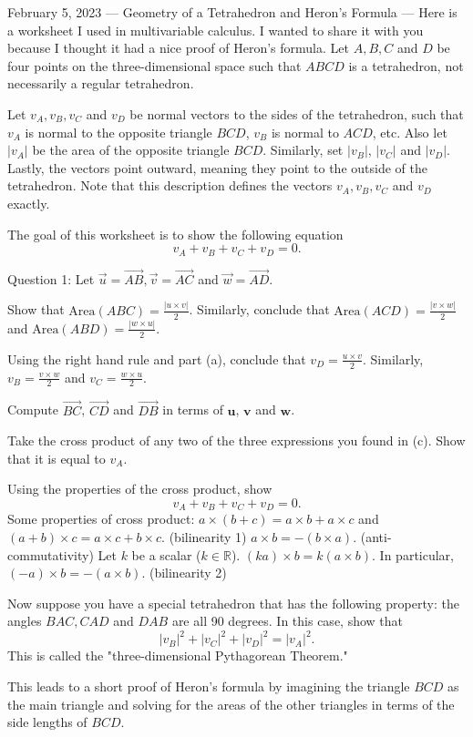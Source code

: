 February 5, 2023
---
Geometry of a Tetrahedron and Heron's Formula
---
Here is a worksheet I used in multivariable calculus. I wanted to share it with you because I thought it had a nice proof of Heron's formula.
Let $A,B,C$ and $D$ be four points on the three-dimensional space such that $ABCD$ is a tetrahedron, not necessarily a regular tetrahedron.

Let  $v_A, v_B, v_C$ and $v_D$ be normal vectors to the sides of the tetrahedron, such that $v_A$ is normal to the opposite triangle $BCD$, $v_B$ is normal to $ACD$, etc. Also let $|v_A|$ be the area of the opposite triangle $BCD$. Similarly, set $|v_B|$, $|v_C|$ and $|v_D|$. Lastly, the vectors point outward, meaning they point to the outside of the tetrahedron. Note that this description defines the vectors $v_A, v_B, v_C$ and $v_D$ exactly.

The goal of this worksheet is to show the following equation $$v_A+v_B+v_C+v_D = 0.$$ 

Question 1: Let $\overset{\rightarrow}{u} = \overset{\rightarrow}{AB}, \overset{\rightarrow}{v} = \overset{\rightarrow}{AC}$ and $\overset{\rightarrow}{w} = \overset{\rightarrow}{AD}.$ 

Show that $\textrm{Area}(ABC) = \frac{|u\times v|}{2}$. Similarly, conclude that $\textrm{Area}(ACD) = \frac{|v\times w|}{2}$ and $\textrm{Area}(ABD) = \frac{|w\times u|}{2}$. 

Using the right hand rule and part (a), conclude that $v_D = \frac{u\times v}{2}$. Similarly, $v_B = \frac{v\times w}{2}$ and $v_C = \frac{w\times u}{2}$. 

Compute $\overset{\rightarrow}{BC}$, $\overset{\rightarrow}{CD}$ and $\overset{\rightarrow}{DB}$ in terms of $\textbf{u}$, $\textbf{v}$ and $\textbf{w}$. 

Take the cross product of any two of the three expressions you found in (c). Show that it is equal to $v_A.$

Using the properties of the cross product, show $$v_A + v_B + v_C + v_D = 0.$$ Some properties of cross product:
$a\times (b+c) = a\times b + a\times c$ and $(a+b) \times c = a\times c + b\times c.$ (bilinearity 1) 
$a\times b = - (b\times a).$ (anti-commutativity)
Let $k$ be a scalar ($k\in \mathbb{R}$). $(ka) \times b = k(a\times b).$ In particular, $(-a)\times b = -(a\times b).$ (bilinearity 2)

Now suppose you have a special tetrahedron that has the following property: the angles $BAC, CAD$ and $DAB$ are all 90 degrees. In this case, show that $$|v_B|^2+|v_C|^2+|v_D|^2 = |v_A|^2.$$ This is called the "three-dimensional Pythagorean Theorem."

This leads to a short proof of Heron's formula by imagining the triangle $BCD$ as the main triangle and solving for the areas of the other triangles in terms of the side lengths of $BCD$.